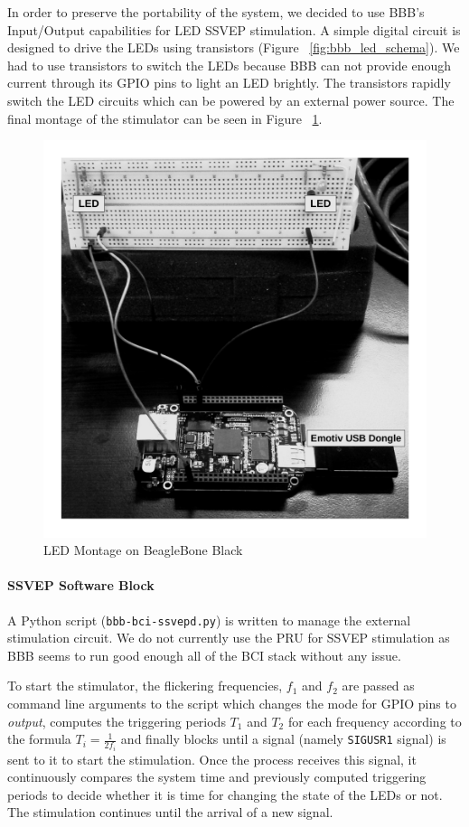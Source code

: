 \documentclass[12pt]{article}
\newcommand\mysubsubsubsection[1]{\paragraph{#1}\hspace{0pt}}
\numberwithin{equation}{section}
\numberwithin{figure}{section}
\numberwithin{table}{section}
\begin{document}
\par{
    In order to preserve the portability of the system, we decided to use BBB's
    Input/Output capabilities for LED SSVEP stimulation. A simple digital circuit is designed to
    drive the LEDs using transistors (Figure ~\ref{fig:bbb_led_schema}).
    We had to use transistors to switch the LEDs because BBB can not provide enough current
    through its GPIO pins to light an LED brightly. The transistors rapidly switch
    the LED circuits which can be powered by an external power source. The final
    montage of the stimulator can be seen in Figure ~\ref{fig:bbb_ssvep}.
    \begin{figure}[ht]
    \centering
    \includegraphics[scale=0.55]{images/bbb_ssvep}
    \caption{LED Montage on BeagleBone Black}
    \label{fig:bbb_ssvep}
    \end{figure}
}

\mysubsubsubsection{SSVEP Software Block}
\par{
    A Python script (\texttt{bbb-bci-ssvepd.py}) is written to manage the external stimulation circuit. We do not
    currently use the PRU for SSVEP stimulation as BBB seems to run good enough
    all of the BCI stack without any issue.
}
\par{
    To start the stimulator, the flickering frequencies, $f_1$ and $f_2$ are passed as command line arguments to the
    script which changes the mode for GPIO pins to \emph{output}, computes
    the triggering periods $T_1$ and $T_2$ for each frequency according to
    the formula $T_i=\frac{1}{2f_i}$ and finally blocks until a signal (namely
    \texttt{SIGUSR1} signal) is sent to it to start the stimulation.
    Once the process receives this signal, it continuously compares the system time and
    previously computed triggering periods to decide whether it is time for
    changing the state of the LEDs or not. The stimulation continues until
    the arrival of a new signal.
}
\end{document}
